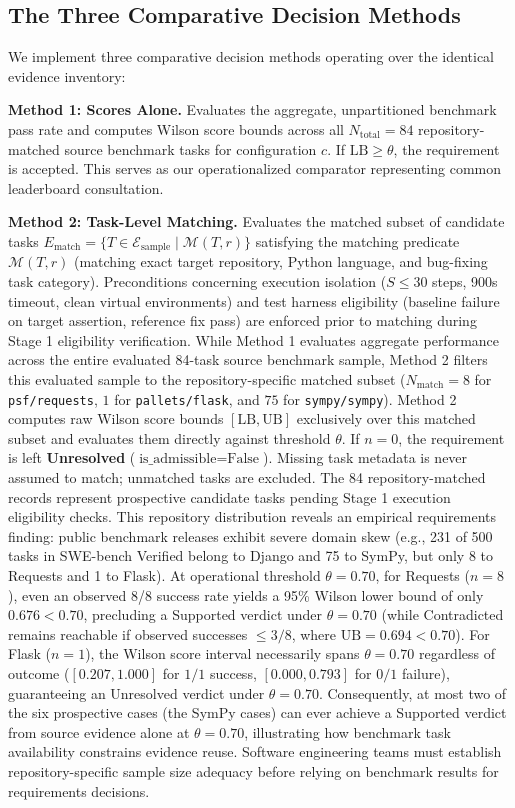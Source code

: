 \documentclass[runningheads]{llncs}
\begin{document}
\subsection{The Three Comparative Decision Methods}
We implement three comparative decision methods operating over the identical evidence inventory:

\textbf{Method 1: Scores Alone.} Evaluates the aggregate, unpartitioned benchmark pass rate and computes Wilson score bounds across all $N_{\text{total}} = 84$ repository-matched source benchmark tasks for configuration $c$. If $\text{LB} \ge \theta$, the requirement is accepted. This serves as our operationalized comparator representing common leaderboard consultation.

\textbf{Method 2: Task-Level Matching.} Evaluates the matched subset of candidate tasks $E_{\text{match}} = \{ T \in \mathcal{E}_{\text{sample}} \mid \mathcal{M}(T, r) \}$ satisfying the matching predicate $\mathcal{M}(T, r)$ (matching exact target repository, Python language, and bug-fixing task category). Preconditions concerning execution isolation ($S \le 30$ steps, 900s timeout, clean virtual environments) and test harness eligibility (baseline failure on target assertion, reference fix pass) are enforced prior to matching during Stage 1 eligibility verification. While Method 1 evaluates aggregate performance across the entire evaluated 84-task source benchmark sample, Method 2 filters this evaluated sample to the repository-specific matched subset ($N_{\text{match}} = 8$ for \texttt{psf/requests}, $1$ for \texttt{pallets/flask}, and $75$ for \texttt{sympy/sympy}). Method 2 computes raw Wilson score bounds $[\text{LB}, \text{UB}]$ exclusively over this matched subset and evaluates them directly against threshold $\theta$. If $n = 0$, the requirement is left \textbf{Unresolved} ($\text{is\_admissible} = \text{False}$). Missing task metadata is never assumed to match; unmatched tasks are excluded. The 84 repository-matched records represent prospective candidate tasks pending Stage 1 execution eligibility checks. This repository distribution reveals an empirical requirements finding: public benchmark releases exhibit severe domain skew (e.g., 231 of 500 tasks in SWE-bench Verified belong to Django and 75 to SymPy, but only 8 to Requests and 1 to Flask). At operational threshold $\theta = 0.70$, for Requests ($n=8$), even an observed 8/8 success rate yields a 95\% Wilson lower bound of only $0.676 < 0.70$, precluding a Supported verdict under $\theta = 0.70$ (while Contradicted remains reachable if observed successes $\le 3/8$, where $\text{UB} = 0.694 < 0.70$). For Flask ($n=1$), the Wilson score interval necessarily spans $\theta = 0.70$ regardless of outcome ($[0.207, 1.000]$ for $1/1$ success, $[0.000, 0.793]$ for $0/1$ failure), guaranteeing an Unresolved verdict under $\theta = 0.70$. Consequently, at most two of the six prospective cases (the SymPy cases) can ever achieve a Supported verdict from source evidence alone at $\theta = 0.70$, illustrating how benchmark task availability constrains evidence reuse. Software engineering teams must establish repository-specific sample size adequacy before relying on benchmark results for requirements decisions.
\end{document}
